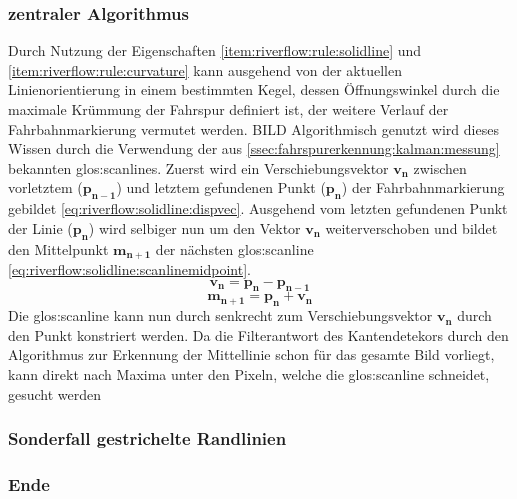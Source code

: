 \subsubsection{zentraler Algorithmus}
Durch Nutzung der Eigenschaften \ref{item:riverflow:rule:solidline} und  \ref{item:riverflow:rule:curvature} kann ausgehend von der aktuellen Linienorientierung in einem bestimmten Kegel, dessen Öffnungswinkel durch die maximale Krümmung der Fahrspur definiert ist, der weitere Verlauf der Fahrbahnmarkierung vermutet werden. BILD
Algorithmisch genutzt wird dieses Wissen durch die Verwendung der aus \ref{ssec:fahrspurerkennung:kalman:messung} bekannten \glspl{glos:scanline}.
Zuerst wird ein Verschiebungsvektor \begin{math} \boldsymbol{v_n} \end{math} zwischen vorletztem (\begin{math} \boldsymbol{p_{n-1}} \end{math}) und letztem gefundenen Punkt  (\begin{math} \boldsymbol{p_n} \end{math})  der Fahrbahnmarkierung gebildet \eqref{eq:riverflow:solidline:dispvec}. Ausgehend vom letzten gefundenen Punkt der Linie (\begin{math} \boldsymbol{p_n} \end{math}) wird selbiger nun um den Vektor \begin{math} \boldsymbol{v_n} \end{math} weiterverschoben und bildet den Mittelpunkt  \begin{math} \boldsymbol{m_{n+1}}  \end{math} der nächsten \gls{glos:scanline} \eqref{eq:riverflow:solidline:scanlinemidpoint}.
\begin{equation}
\label{eq:riverflow:solidline:dispvec}
\boldsymbol{v_n} =  \boldsymbol{p_n} - \boldsymbol{p_{n-1}}
\end{equation}
\begin{equation}
\label{eq:riverflow:solidline:scanlinemidpoint}
\boldsymbol{m_{n+1}} =  \boldsymbol{p_n} + \boldsymbol{v_n}
\end{equation}
 Die \gls{glos:scanline} kann nun durch senkrecht zum Verschiebungsvektor \begin{math} \boldsymbol{v_n} \end{math}  durch den Punkt  konstriert werden.
Da die Filterantwort des Kantendetekors durch den Algorithmus zur Erkennung der Mittellinie schon für das gesamte Bild vorliegt, kann direkt nach Maxima unter den Pixeln, welche die \gls{glos:scanline} schneidet, gesucht werden

\subsubsection{Sonderfall gestrichelte Randlinien}
\subsubsection{Ende}